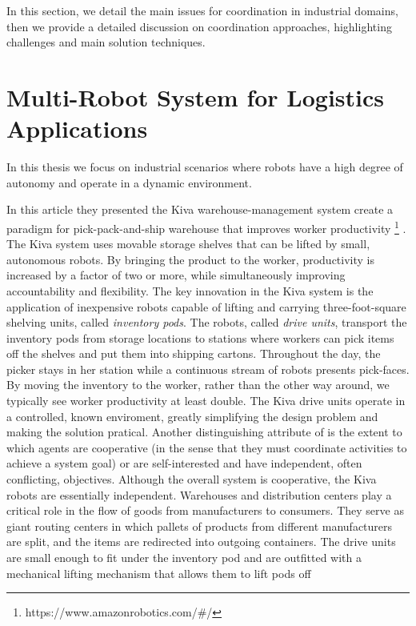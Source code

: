 In this section, we detail the main issues for \mrs coordination 
in industrial domains, then we provide a detailed discussion on coordination
approaches, highlighting challenges and main solution techniques.

\section{Multi-Robot System for Logistics Applications}
In this thesis we focus on industrial scenarios where robots have a high
degree of autonomy and operate in a dynamic environment.

In this article \cite{coocoo} they presented the Kiva warehouse-management system 
create a paradigm for pick-pack-and-ship warehouse that improves worker productivity \footnote{https://www.amazonrobotics.com/\#/} .
The Kiva system uses movable storage shelves that can be lifted by small, autonomous robots.
By bringing the product to the worker, productivity is increased by a factor of two or more,
while simultaneously improving accountability and flexibility.
The key innovation in the Kiva system is the application of
inexpensive robots capable of lifting and carrying
three-foot-square shelving units, called \textit{inventory pods}.
The robots, called \textit{drive units}, transport the inventory pods from storage
locations to stations where workers can pick items off the shelves and
put them into shipping cartons. Throughout the
day, the picker stays in her station while a continuous stream of robots presents
pick-faces. By moving the inventory to the worker, rather than the
other way around, we typically see worker productivity at least double.
The Kiva drive units operate in a controlled, known enviroment, greatly simplifying
the design problem and making the solution pratical.
Another distinguishing attribute of \mrs is the extent to which agents are cooperative 
(in the sense that they must coordinate activities to achieve a system goal) 
or are self-interested and have independent, often conflicting, objectives.
Although the overall system is cooperative, the Kiva robots are essentially independent.
Warehouses and distribution centers play a critical role in the flow of goods from 
manufacturers to consumers. They serve as giant routing centers in which pallets
of products from different manufacturers are split, and the items are redirected
into outgoing containers.
The drive units are small enough to fit under the inventory pod and are outfitted
with a mechanical lifting mechanism that allows them to lift pods off
